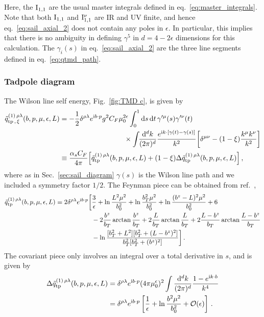 \documentclass[11pt,a4paper]{article}
\DeclareRobustCommand{\eq}[1]{eq.~\eqref{eq:#1}}
\DeclareRobustCommand{\fig}[1]{Fig.~\ref{fig:#1}}
\DeclareRobustCommand{\sec}[1]{Sec.~\ref{sec:#1}}
\DeclareRobustCommand{\mycite}[1]{ref.~\cite{#1}}
\newcommand{\df}{\mathrm{d}}
\newcommand{\img}{\mathrm{i}}
\newcommand{\eps}{\epsilon}
\newcommand{\cO}{\mathcal{O}}
\newcommand{\nn}{\nonumber}
\newcommand{\as}{\alpha_s}
\newcommand{\MI}{\mathbf{\rm I}}
\begin{document}
Here, the $\MI_{1,1}$ are the usual master integrals defined in \eq{master_integrals}.
Note that both $\MI_{1,1}$ and $\MI_{1,1}^\nu$ are IR and UV finite, and hence \eq{sail_axial_2} does not contain any poles in $\eps$.
In particular, this implies that there is no ambiguity in defining $\gamma^5$ in $d=4-2\eps$ dimensions for this calculation.
The $\gamma_i(s)$ in \eq{sail_axial_2} are the three line segments defined in \eq{qtmd_path}.


\subsubsection{Tadpole diagram}
\label{sec:tadpole_diagram}

The Wilson line self energy, \fig{TMD c}, is given by
\begin{align} \label{eq:q_c}
 \tilde q^{(1)\,\rho\lambda}_{{\rm tp}\,,\,\xi}(b,p,\mu,\eps,L) &
 = - \frac12 \delta^{\rho\lambda} e^{\img b \cdot p}  g^2 C_F \mu_0^{2\eps}
   \int_0^1 \df s \, \df t \, \gamma^{\prime\mu}(s) \gamma^{\prime\nu}(t)
   \nn\\&\hspace{3.2cm}\times
   \int\!\!\frac{\df^d k}{(2\pi)^d} \frac{e^{\img k \cdot [\gamma(t)-\gamma(s)]}}{k^2}
   \biggl[ \delta^{\mu\nu} - (1-\xi) \frac{k^\mu k^\nu}{k^2}  \biggr]
\nn\\&
 \equiv \frac{\as C_F}{4\pi} \Bigl[ \tilde q^{(1)\,\rho\lambda}_{\rm tp}(b,p,\mu,\eps,L) + (1-\xi) \Delta\tilde q^{(1)\,\rho\lambda}_{\rm tp}(b,p,\mu,\eps,L) \Bigr]
\,,\end{align}
where as in \sec{sail_diagram} $\gamma(s)$ is the Wilson line path and we included a symmetry factor $1/2$.
The Feynman piece can be obtained from \mycite{Ebert:2019okf},
\begin{align} \label{eq:tadpole_final}
 \tilde q^{(1)\,\rho\lambda}_{\rm tp}(b,p,\mu,\eps,L)
 = 2 \delta^{\rho\lambda} e^{\img b \cdot p} \biggl[&
    \frac{3}{\eps} + \ln\frac{L^2 \mu^2}{b_0^2}  + \ln\frac{b_T^2 \mu^2}{b_0^2} + \ln\frac{(b^z-L)^2 \mu^2}{b_0^2} + 6
   \nn\\&
   - 2\frac{b^z}{b_T} \arctan\frac{b^z}{b_T} + 2\frac{L}{b_T} \arctan\frac{L}{b_T} + 2 \frac{L - b^z}{b_T} \arctan\frac{L-b^z}{b_T}
   \nn\\&
   - \ln\frac{[b_T^2 + L^2] [ b_T^2 + (L - b^z)^2]}{b_T^2 [b_T^2 + (b^z)^2]}
 \biggr]
\,.\end{align}
The covariant piece only involves an integral over a total derivative in $s$, and is given by
\begin{align} \label{eq:tadpole_cov_final}
 \Delta\tilde q^{(1)\,\rho\lambda}_{\rm tp}(b,p,\mu,\eps,L) &
 = \delta^{\rho\lambda} e^{\img b \cdot p} (4\pi \mu_0^{\eps})^2 \int\frac{\df^d k}{(2\pi)^d} \frac{1 - e^{\img k \cdot b}}{k^4}
 \nn\\&
 = \delta^{\rho\lambda} e^{\img b \cdot p} \left[  \frac{1}{\eps} + \ln\frac{b^2 \mu^2}{b_0^2} + \cO(\eps) \right]
\,.\end{align}
\end{document}
